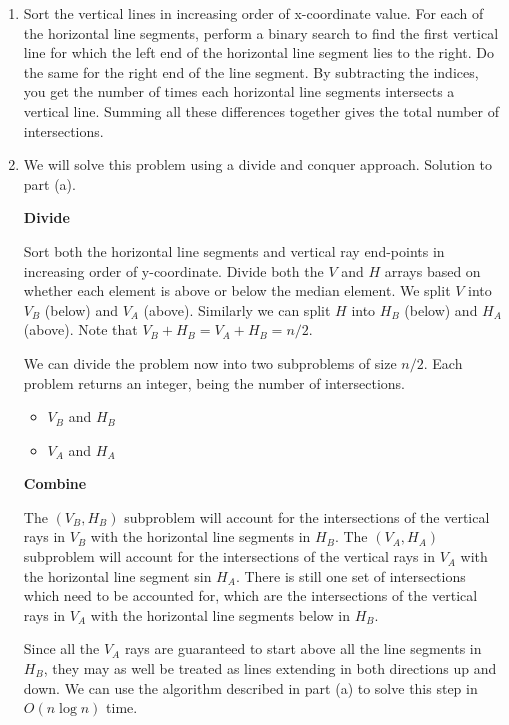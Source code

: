 \documentclass{article}
\begin{document}
\begin{solution}
\begin{enumerate}[label = (\alph*)]
    \item Sort the vertical lines in increasing order of x-coordinate value.
    For each of the horizontal line segments, perform a binary search to find the first 
    vertical line for which the left end of the horizontal line segment lies to the right.
    Do the same for the right end of the line segment.
    By subtracting the indices, you get the number of times each horizontal line segments intersects a vertical line.
    Summing all these differences together gives the total number of intersections.

    \item We will solve this problem using a divide and conquer approach. Solution to part (a).

    \textbf{Divide}

    Sort both the horizontal line segments and vertical ray end-points in increasing order of y-coordinate.
    Divide both the $V$ and $H$ arrays based on whether each element is above or below the median element.
    We split $V$ into $V_B$ (below) and $V_A$ (above). Similarly we can split $H$ into $H_B$ (below) and $H_A$ (above).
    Note that $V_B + H_B = V_A + H_B = n/2$.

    We can divide the problem now into two subproblems of size $n/2$. Each problem returns an integer, being the number of intersections.
    \begin{itemize}
        \item $V_B$ and $H_B$
        \item $V_A$ and $H_A$
    \end{itemize}

    \textbf{Combine}

    The $(V_B, H_B)$ subproblem will account for the intersections of the vertical rays in $V_B$
    with the horizontal line segments in $H_B$.
    The $(V_A, H_A)$ subproblem will account for the intersections of the vertical rays in $V_A$
    with the horizontal line segment sin $H_A$.
    There is still one set of intersections which need to be accounted for, which are the intersections 
    of the vertical rays in $V_A$ with the horizontal line segments below in $H_B$.

    Since all the $V_A$ rays are guaranteed to start above all the line segments in $H_B$, 
    they may as well be treated as lines extending in both directions up and down. 
    We can use the algorithm described in part (a) to solve this step in $O(n\log n)$ time.


\end{enumerate}
\end{solution}
\end{document}
